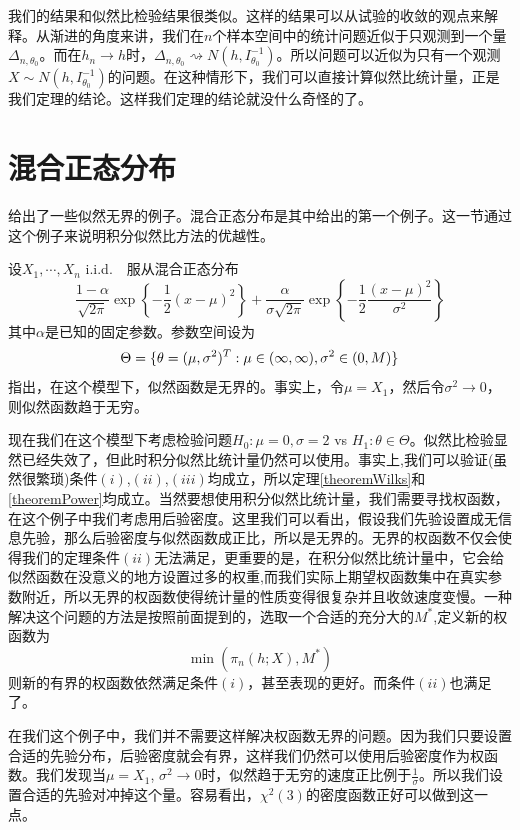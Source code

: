 \documentclass[review]{elsarticle}
\begin{document}
我们的结果和似然比检验结果很类似。这样的结果可以从试验的收敛的观点来解释。从渐进的角度来讲，我们在$n$个样本空间中的统计问题近似于只观测到一个量$\Delta_{n,\theta_0}$。而在$h_n\to h$时，$\Delta_{n,\theta_0}\rightsquigarrow N(h,I_{\theta_0}^{-1})$。所以问题可以近似为只有一个观测$X\sim
N(h,I_{\theta_0}^{-1})$的问题。在这种情形下，我们可以直接计算似然比统计量，正是我们定理的结论。这样我们定理的结论就没什么奇怪的了。

\section{混合正态分布}
\cite{Cam1990Maximum}给出了一些似然无界的例子。混合正态分布是其中给出的第一个例子。这一节通过这个例子来说明积分似然比方法的优越性。

设$X_1,\cdots,X_n$ i.i.d.　服从混合正态分布
\begin{equation}
    \frac{1-\alpha}{\sqrt{2\pi}}\exp\left\{-\frac{1}{2}(x-\mu)^2\right\}+
    \frac{\alpha}{\sigma\sqrt{2\pi}}\exp\left\{-\frac{1}{2}\frac{(x-\mu)^2}{\sigma^2}\right\}
\end{equation}
其中$\alpha$是已知的固定参数。参数空间设为
\begin{equation}
    \Theta=\{\theta=(\mu,\sigma^2)^T:\mu\in(\-\infty,\infty),\sigma^2\in (0,M)\}
\end{equation}
\cite{Cam1990Maximum}指出，在这个模型下，似然函数是无界的。事实上，令$\mu=X_1$，然后令$\sigma^2\to 0$，则似然函数趋于无穷。

现在我们在这个模型下考虑检验问题$H_0:\mu=0,\sigma=2$ vs $H_1:\theta\in
\Theta$。似然比检验显然已经失效了，但此时积分似然比统计量仍然可以使用。事实上,我们可以验证(虽然很繁琐)条件$(i)$,$(ii)$,$(iii)$均成立，所以定理\ref{theoremWilks}和\ref{theoremPower}均成立。当然要想使用积分似然比统计量，我们需要寻找权函数，在这个例子中我们考虑用后验密度。这里我们可以看出，假设我们先验设置成无信息先验，那么后验密度与似然函数成正比，所以是无界的。无界的权函数不仅会使得我们的定理条件$(ii)$无法满足，更重要的是，在积分似然比统计量中，它会给似然函数在没意义的地方设置过多的权重,而我们实际上期望权函数集中在真实参数附近，所以无界的权函数使得统计量的性质变得很复杂并且收敛速度变慢。一种解决这个问题的方法是按照前面提到的，选取一个合适的充分大的$M^*$,定义新的权函数为
\begin{equation}
    \min(\pi_n(h;X),M^*)
\end{equation}
则新的有界的权函数依然满足条件$(i)$，甚至表现的更好。而条件$(ii)$也满足了。

在我们这个例子中，我们并不需要这样解决权函数无界的问题。因为我们只要设置合适的先验分布，后验密度就会有界，这样我们仍然可以使用后验密度作为权函数。我们发现当$\mu=X_1$, $\sigma^2\to 0$时，似然趋于无穷的速度正比例于$\frac{1}{\sigma}$。所以我们设置合适的先验对冲掉这个量。容易看出，$\chi^2(3)$的密度函数正好可以做到这一点。
\end{document}
